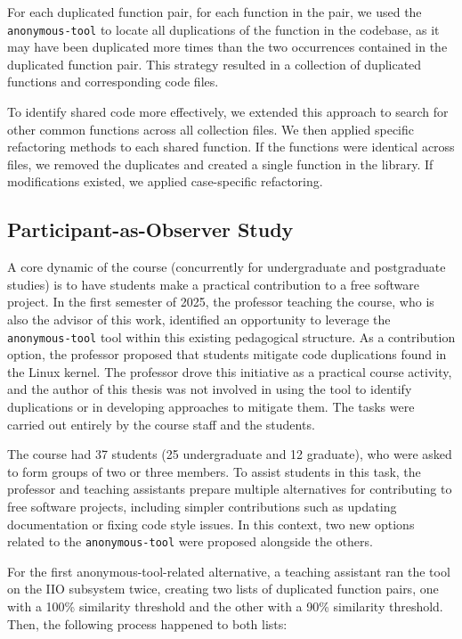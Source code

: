 \documentclass[10pt,conference]{IEEEtran}
\begin{document}
For each duplicated function pair, for each function in the pair, we used the \texttt{anonymous-tool} to locate all duplications of the function in the codebase, as it may have been duplicated more times than the two occurrences contained in the duplicated function pair. 
This strategy resulted in a collection of duplicated functions and corresponding code files.

To identify shared code more effectively, we extended this approach to search for other common 
functions across all collection files. We then applied specific refactoring methods to each shared 
function. If the functions were identical across files, we removed the duplicates and created a single 
function in the library. If modifications existed, we applied case-specific refactoring.

\subsection{Participant-as-Observer Study}

A core dynamic of the course (concurrently for undergraduate and postgraduate studies) is to have students make a practical contribution to a free software project. In the first semester of 2025, the professor teaching the course, who is also the advisor of this work, identified an opportunity to leverage the \texttt{anonymous-tool} tool within this existing pedagogical structure. As a contribution option, the professor proposed that students mitigate code duplications found in the Linux kernel. The professor drove this initiative as a practical course activity, and the author of this thesis was not involved in using the tool to identify duplications or in developing approaches to mitigate them. The tasks were carried out entirely by the course staff and the students.

The course had 37 students (25 undergraduate and 12 graduate), who were asked to form groups of 
two or three members. To assist students in this task, the professor and teaching assistants prepare multiple 
alternatives for contributing to free software projects, including simpler contributions such as 
updating documentation or fixing code style issues. In this context, two new options related to the 
\texttt{anonymous-tool} were proposed alongside the others.

For the first anonymous-tool-related alternative, a teaching assistant ran the tool on the IIO subsystem twice, creating two lists of duplicated function pairs, one with a 100\% similarity threshold and the other with a 90\% similarity threshold. Then, the following process happened to both lists:
\end{document}
